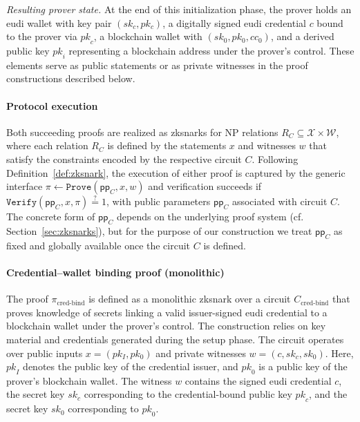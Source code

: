 \medskip	
\textit{Resulting prover state.}
At the end of this initialization phase, the prover holds an \acrshort{eudi} wallet with key pair $(sk_c, pk_c)$, a digitally signed \acrshort{eudi} credential $\mathit{c}$ bound to the prover via $\mathit{pk}_c$, a blockchain wallet with $(sk_0, pk_0, cc_0)$, and a derived public key $\mathit{pk}_i$ representing a blockchain address under the prover’s control. These elements serve as public statements or as private witnesses in the proof constructions described below.

\paragraph{Protocol execution}
Both succeeding proofs are realized as \acrshort{zksnark}s for NP relations $R_C \subseteq \mathcal{X} \times \mathcal{W}$, where each relation $R_C$ is defined by the statements $x$ and witnesses $w$ that satisfy the constraints encoded by the respective circuit $C$. Following Definition~\ref{def:zksnark}, the execution of either proof is captured by the generic interface $\pi \gets \texttt{Prove}(\mathsf{pp}_C, x, w)$ and verification succeeds if $\texttt{Verify}(\mathsf{pp}_C, x, \pi) \overset{?}{=} 1$, with public parameters $\mathsf{pp}_C$ associated with circuit $C$. The concrete form of $\mathsf{pp}_C$ depends on the underlying proof system (cf. Section~\ref{sec:zksnarks}), but for the purpose of our construction we treat $\mathsf{pp}_C$ as fixed and globally available once the circuit $C$ is defined.

\paragraph{Credential–wallet binding proof (monolithic)}
The proof $\pi_{\text{cred-bind}}$ is defined as a monolithic \acrshort{zksnark} over a circuit $C_{\text{cred-bind}}$ that proves knowledge of secrets linking a valid issuer-signed \acrshort{eudi} credential to a blockchain wallet under the prover’s control. The construction relies on key material and credentials generated during the setup phase. The circuit operates over public inputs $x = (pk_I, pk_0)$ and private witnesses $w = (c, sk_c, sk_0)$. Here, $\mathit{pk}_I$ denotes the public key of the credential issuer, and $\mathit{pk}_0$ is a public key of the prover’s blockchain wallet. The witness $w$ contains the signed \acrshort{eudi} credential $c$, the secret key $\mathit{sk}_c$ corresponding to the credential-bound public key $\mathit{pk}_c$, and the secret key $\mathit{sk}_0$ corresponding to $\mathit{pk}_0$. 

